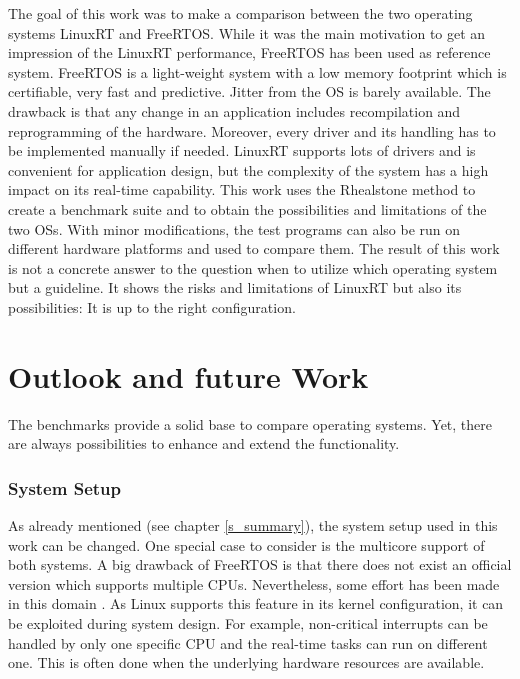 The goal of this work was to make a comparison between the two operating systems LinuxRT and FreeRTOS. 
While it was the main motivation to get an impression of the LinuxRT performance, FreeRTOS has been used as reference system.
FreeRTOS is a light-weight system with a low memory footprint which is certifiable, very fast and predictive. 
Jitter from the \ac{OS} is barely available. 
The drawback is that any change in an application includes recompilation and reprogramming of the hardware.
Moreover, every driver and its handling has to be implemented manually if needed.
LinuxRT supports lots of drivers and is convenient for application design, but the complexity of the system has a high impact on its real-time capability.
This work uses the Rhealstone method to create a benchmark suite and to obtain the possibilities and limitations of the two \acp{OS}.
With minor modifications, the test programs can also be run on different hardware platforms and used to compare  them.
The result of this work is not a concrete answer to the question when to utilize which operating system but a guideline.
It shows the risks and limitations of LinuxRT but also its possibilities: It is up to the right configuration. 

\section{Outlook and future Work}
The benchmarks provide a solid base to compare operating systems.
Yet, there are always possibilities to enhance and extend the functionality.

\subsubsection{System Setup}
As already mentioned (see chapter \ref{s_summary}), the system setup used in this work can be changed.
One special case to consider is the multicore support of both systems.
A big drawback of FreeRTOS is that there does not exist an official version which supports multiple \acp{CPU}.
Nevertheless, some effort has been made in this domain \cite{mistry:affmaer}.
As Linux supports this feature in its kernel configuration, it can be exploited during system design.
For example, non-critical interrupts can be handled by only one specific \ac{CPU} and the real-time tasks can run on different one.
This is often done when the underlying hardware resources are available. 

